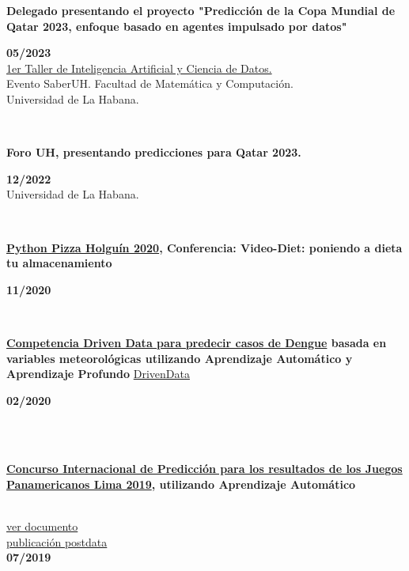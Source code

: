 \documentclass{article}
\begin{document}
\begin{minipage}{0.8\textwidth}
\parbox{0.8\linewidth}{\textbf{Delegado presentando el proyecto "Predicción de la Copa Mundial de Qatar 2023, enfoque basado en agentes impulsado por datos"}} \hfill \textbf{05/2023}\\
\hyperref[sec:workshop]{1er Taller de Inteligencia Artificial y Ciencia de Datos.} \\
Evento SaberUH. Facultad de Matemática y Computación. \\
Universidad de La Habana.\\
\end{minipage} \\
\begin{minipage}{0.8\textwidth}
\parbox{0.8\linewidth}{\textbf{Foro UH, presentando predicciones para Qatar 2023.}} \hfill \textbf{12/2022}\\
Universidad de La Habana.\\
\end{minipage}\\
\begin{minipage}{0.8\textwidth}
\parbox{0.8\linewidth}{\textbf{\hyperref[sec:pythonpizza]{Python Pizza Holguín 2020}, Conferencia: Video-Diet: poniendo a dieta tu almacenamiento}} \hfill \textbf{11/2020}\\
\end{minipage} \\
\begin{minipage}{0.8\textwidth}
\parbox{0.8\linewidth}{\textbf{\hyperref[sec:dengue]{Competencia Driven Data para predecir casos de Dengue} basada en variables meteorológicas utilizando Aprendizaje Automático y Aprendizaje Profundo} \href{https://www.drivendata.org/competitions/44/dengai-predicting-disease-spread}{DrivenData}} \hfill \textbf{02/2020}\\
\\
\end{minipage} \hfill {}\\
\begin{minipage}{0.8\textwidth}
\parbox{0.8\linewidth}{\textbf{\hyperref[sec:panamerican]{Concurso Internacional de Predicción para los resultados de los Juegos Panamericanos Lima 2019}, utilizando Aprendizaje Automático} }\\
\href{https://github.com/JavierOramas/PanamericanPredictor/blob/master/panamerican_predictor_paper.pdf}{ver documento}\\
\href{http://www.postdata.club/issues/201907/el-medallero-de-lima-2019-que-se-puede-esperar.html}{publicación postdata}\\
\hfill \textbf{07/2019}\\
\\
\end{minipage} \hfill {}\\
\end{document}
